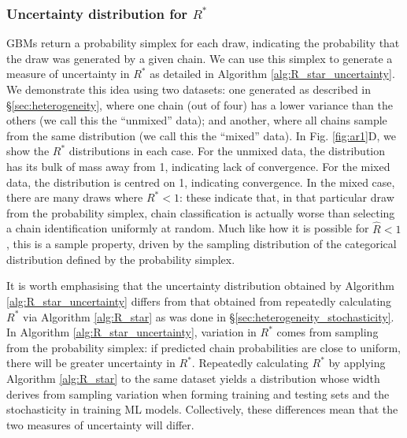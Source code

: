 \documentclass{article}
\begin{document}
\subsubsection{Uncertainty distribution for $R^*$}\label{sec:heterogeneity_uncertainty}
GBMs return a probability simplex for each draw, indicating the probability that the draw was generated by a given chain. We can use this simplex to generate a measure of uncertainty in $R^*$ as detailed in Algorithm \ref{alg:R_star_uncertainty}. We demonstrate this idea using two datasets: one generated as described in \S\ref{sec:heterogeneity}, where one chain (out of four) has a lower variance than the others (we call this the ``unmixed'' data); and another, where all chains sample from the same distribution (we call this the ``mixed'' data). In Fig. \ref{fig:ar1}D, we show the $R^*$ distributions in each case. For the unmixed data, the distribution has its bulk of mass away from 1, indicating lack of convergence. For the mixed data, the distribution is centred on 1, indicating convergence. In the mixed case, there are many draws where $R^*<1$: these indicate that, in that particular draw from the probability simplex, chain classification is actually worse than selecting a chain identification uniformly at random. Much like how it is possible for $\hat{R}<1$, this is a sample property, driven by the sampling distribution of the categorical distribution defined by the probability simplex.

It is worth emphasising that the uncertainty distribution obtained by Algorithm \ref{alg:R_star_uncertainty} differs from that obtained from repeatedly calculating $R^*$ via Algorithm \ref{alg:R_star} as was done in \S\ref{sec:heterogeneity_stochasticity}. In Algorithm \ref{alg:R_star_uncertainty}, variation in $R^*$ comes from sampling from the probability simplex: if predicted chain probabilities are close to uniform, there will be greater uncertainty in $R^*$. Repeatedly calculating $R^*$ by applying Algorithm \ref{alg:R_star} to the same dataset yields a distribution whose width derives from sampling variation when forming training and testing sets and the stochasticity in training ML models. Collectively, these differences mean that the two measures of uncertainty will differ.
\end{document}
